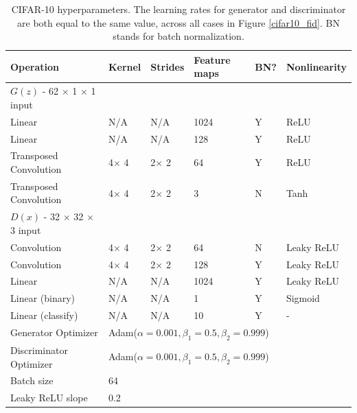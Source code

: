 \documentclass{article}
\begin{document}
\begin{table}[htbp]
\caption{CIFAR-10 hyperparameters. The learning rates for generator and discriminator are both equal to the same value, across all cases in Figure \ref{cifar10_fid}. BN stands for batch normalization.}
\centering
\begin{tabular}{llllll}
\hline 
Operation& Kernel &Strides &Feature maps & BN? & Nonlinearity\\
\hline 
$G(z)$ - 62 $\times$ 1 $\times$ 1 input  & & & & & \\
Linear & N/A & N/A&1024 & Y & ReLU\\
Linear & N/A & N/A&128 & Y & ReLU\\
Transposed Convolution &4$\times$ 4 & 2$\times$ 2 &64 & Y & ReLU\\
Transposed Convolution &4$\times$ 4 & 2$\times$ 2 &3 & N & Tanh\\
$D(x)$ - 32 $\times$ 32 $\times$ 3 input  & & & & & \\
Convolution &4$\times$ 4 & 2$\times$ 2 &64 & N & Leaky ReLU\\
Convolution &4$\times$ 4 & 2$\times$ 2 &128 & Y & Leaky ReLU\\
Linear & N/A & N/A&1024 & Y &Leaky ReLU\\
Linear (binary) & N/A & N/A&1 & Y &Sigmoid\\
Linear (classify)& N/A & N/A&10 & Y &-\\
Generator Optimizer &\multicolumn{5}{l}{Adam($\alpha=0.001, \beta_1=0.5, \beta_2=0.999$)}\\
Discriminator Optimizer &\multicolumn{5}{l}{Adam($\alpha=0.001, \beta_1=0.5, \beta_2=0.999$)}\\
Batch size &\multicolumn{5}{l}{64}\\
Leaky ReLU slope &\multicolumn{5}{l}{0.2}\\
\hline
\end{tabular}
\label{tab:cifar10}
\end{table}
\end{document}
